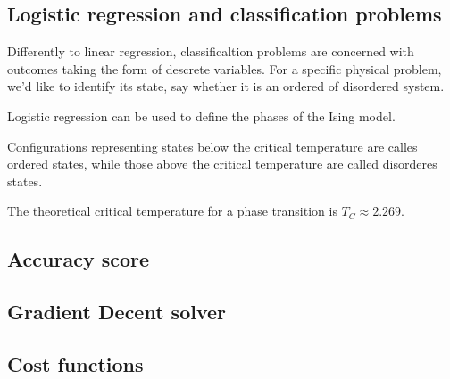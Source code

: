 \subsection{Logistic regression and classification problems}
Differently to linear regression, classificaltion problems 
are concerned with outcomes taking the form of descrete variables. 
For a specific physical problem, we'd like to identify its state, say whether
it is an ordered of disordered system. ~\cite{LectureNotes-FysStk}

Logistic regression can be used to define the phases of the Ising
model.~\cite{LectureNotes} 

Configurations representing states below the critical temperature are calles 
ordered states, while those above the critical temperature are called 
disorderes states. ~\cite{Project2} 

The theoretical critical temperature for a phase transition is 
\(T_C \approx 2.269\). 

\subsection{Accuracy score}

\subsection{Gradient Decent solver}

\subsection{Cost functions} 







